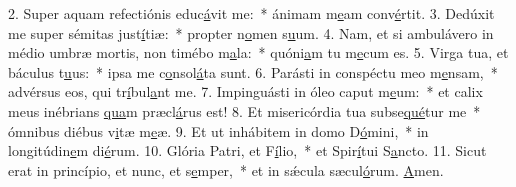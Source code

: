 2. Super aquam refectiónis educ\uline{á}vit me:~* ánimam m\uline{e}am conv\uline{é}rtit.
3. Dedúxit me super sémitas just\uline{í}tiæ:~* propter n\uline{o}men s\uline{u}um.
4. Nam, et si ambulávero in médio umbræ mortis, non timébo m\uline{a}la:~* quóni\uline{a}m tu m\uline{e}cum es.
5. Virga tua, et báculus t\uline{u}us:~* ipsa me c\uline{o}nsol\uline{á}ta sunt.
6. Parásti in conspéctu meo m\uline{e}nsam,~* advérsus eos, qui tr\uline{í}bul\uline{a}nt me.
7. Impinguásti in óleo caput m\uline{e}um:~* et calix meus inébrians \uline{qua}m præcl\uline{á}rus est!
8. Et misericórdia tua subse\uline{qué}tur me~* ómnibus diébus v\uline{i}tæ m\uline{e}æ.
9. Et ut inhábitem in domo D\uline{ó}mini,~* in longitúdin\uline{e}m di\uline{é}rum.
10. Glória Patri, et F\uline{í}lio,~* et Spir\uline{í}tui S\uline{a}ncto.
11. Sicut erat in princípio, et nunc, et s\uline{e}mper,~* et in sǽcula sæcul\uline{ó}rum. \uline{A}men.
